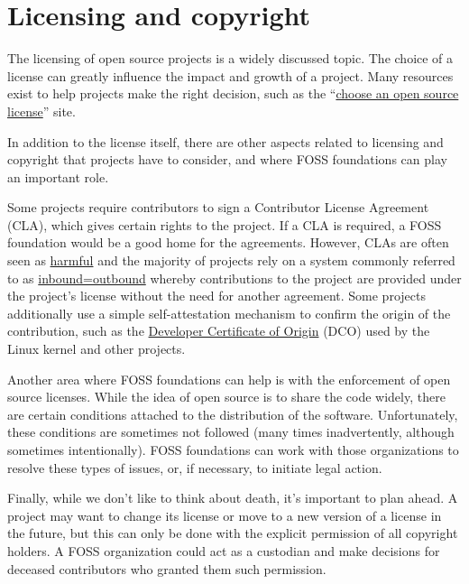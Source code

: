 


\chapter{Licensing and copyright}

The licensing of open source projects is a widely discussed topic.  The choice of a license can greatly influence the impact and growth of a project.  Many resources exist to help projects make the right decision, such as the ``\href{https://choosealicense.com/}{choose an open source license}'' site.

In addition to the license itself, there are other aspects related to licensing and copyright that projects have to consider, and where FOSS foundations can play an important role.

Some projects require contributors to sign a Contributor License Agreement (CLA), which gives certain rights to the project.  If a CLA is required, a FOSS foundation would be a good home for the agreements.  However, CLAs are often seen as \href{https://opensource.com/article/19/2/cla-problems}{harmful} and the majority of projects rely on a system commonly referred to as \href{https://opensource.com/law/11/7/trouble-harmony-part-1}{inbound=outbound} whereby contributions to the project are provided under the project's license without the need for another agreement.  Some projects additionally use a simple self-attestation mechanism to confirm the origin of the contribution, such as the \href{https://developercertificate.org/}{Developer Certificate of Origin} (DCO) used by the Linux kernel and other projects.

Another area where FOSS foundations can help is with the enforcement of open source licenses.  While the idea of open source is to share the code widely, there are certain conditions attached to the distribution of the software.  Unfortunately, these conditions are sometimes not followed (many times inadvertently, although sometimes intentionally).  FOSS foundations can work with those organizations to resolve these types of issues, or, if necessary, to initiate legal action.

Finally, while we don't like to think about death, it's important to plan ahead.  A project may want to change its license or move to a new version of a license in the future, but this can only be done with the explicit permission of all copyright holders.  A FOSS organization could act as a custodian and make decisions for deceased contributors who granted them such permission.

